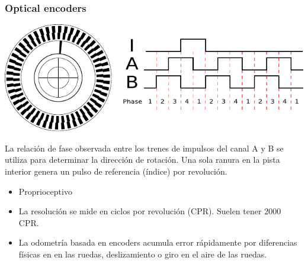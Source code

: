 \begin{frame}
    \frametitle{Optical encoders}

    \includegraphics[width=\columnwidth]{images/encoder.pdf}
    \footnotesize

    La relación de fase observada entre los trenes de impulsos del canal A y B se utiliza para determinar la dirección de rotación. Una sola ranura en la pista interior genera un pulso de referencia (índice) por revolución.

    \begin{itemize}
        \item Proprioceptivo
        \item La resolución se mide en ciclos por revolución (CPR). Suelen tener 2000 CPR.
        \item La odometría basada en encoders acumula error rápidamente por diferencias físicas en en las ruedas, deslizamiento o giro en el aire de las ruedas.
    \end{itemize}
\end{frame}